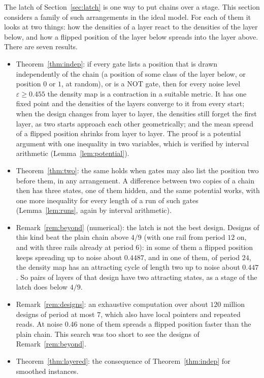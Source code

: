 \documentclass[11pt]{amsart}
\theoremstyle{definition}
\theoremstyle{remark}
\newcommand{\eps}{\varepsilon}
\begin{document}
The latch of Section~\ref{sec:latch} is one way to put chains over a stage. This section considers
a family of such arrangements in the ideal model. For each of them it looks at two things: how
the densities of a layer react to the densities of the layer below, and how a flipped position of
the layer below spreads into the layer above. There are seven results.
\begin{itemize}[leftmargin=2em]
\item Theorem~\ref{thm:indep}: if every gate lists a position that is drawn independently of the
chain (a position of some class of the layer below, or position $0$ or $1$, at random), or is a
NOT gate, then for every noise level $\eps\ge0.455$ the density map is a contraction in a suitable
metric. It has one fixed point and the densities of the layers converge to it from every start;
when the design changes from layer to layer, the densities still forget the first layer, as two
starts approach each other geometrically; and the mean spread of a flipped position shrinks from
layer to layer. The proof is a potential argument with one inequality in two variables, which is
verified by interval arithmetic (Lemma~\ref{lem:potential}).
\item Theorem~\ref{thm:two}: the same holds when gates may also list the position two before
them, in any arrangement. A difference between two copies of a chain then has three states, one
of them hidden, and the same potential works, with one more inequality for every length of a
run of such gates (Lemma~\ref{lem:runs}, again by interval arithmetic).
\item Remark~\ref{rem:beyond} (numerical): the latch is not the best design. Designs of this kind
beat the plain chain above $4/9$ (with one rail from period $12$ on, and with three rails already
at period $6$): in some of them a flipped
position keeps spreading up to noise about $0.4487$, and in one of them, of period $24$, the
density map has an attracting cycle of length two up to noise about $0.447$. So pairs of layers
of that design have two attracting states, as a stage of the latch does below $4/9$.
\item Remark~\ref{rem:designs}: an exhaustive computation over about $120$ million designs of
period at most $7$, which also have local pointers and repeated reads. At noise $0.46$ none of
them spreads a flipped position faster than the plain chain. This search was too short to see the
designs of Remark~\ref{rem:beyond}.
\item Theorem~\ref{thm:layered}: the consequence of Theorem~\ref{thm:indep} for smoothed instances.

\end{itemize}
\end{document}
